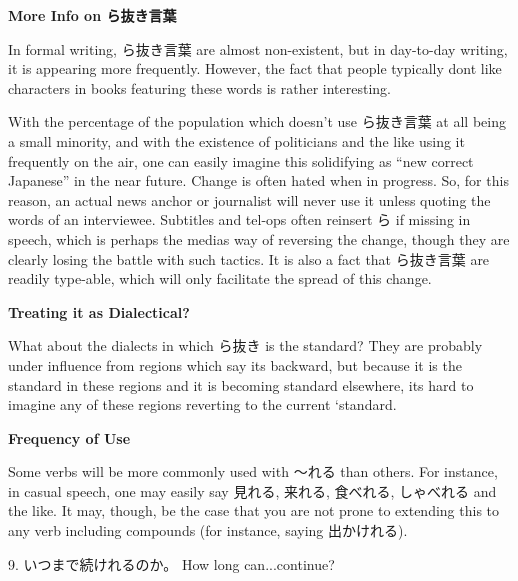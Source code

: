 \par{ \textbf{More Info on ら抜き言葉 }}

\par{ In formal writing, ら抜き言葉 are almost non-existent, but in day-to-day writing, it is appearing more frequently. However, the fact that people typically don\textquotesingle t like characters in books featuring these words is rather interesting. }

\par{ With the percentage of the population which doesn't use ら抜き言葉 at all being a small minority, and with the existence of politicians and the like using it frequently on the air, one can easily imagine this solidifying as “new correct Japanese” in the near future. Change is often hated when in progress. So, for this reason, an actual news anchor or journalist will never use it unless quoting the words of an interviewee. Subtitles and tel-ops often reinsert ら if missing in speech, which is perhaps the media\textquotesingle s way of reversing the change, though they are clearly losing the battle with such tactics. It is also a fact that ら抜き言葉 are readily type-able, which will only facilitate the spread of this change. }

\begin{center}
 \textbf{Treating it as Dialectical? }
\end{center}

\par{ What about the dialects in which ら抜き is the standard? They are probably under influence from regions which say it\textquotesingle s backward, but because it is the standard in these regions and it is becoming standard elsewhere, it\textquotesingle s hard to imagine any of these regions reverting to the current ‘standard\textquotesingle . }

\begin{center}
 \textbf{Frequency of Use }
\end{center}

\par{ Some verbs will be more commonly used with ～れる than others. For instance, in casual speech, one may easily say 見れる, 来れる, 食べれる, しゃべれる and the like. It may, though, be the case that you are not prone to extending this to any verb including compounds (for instance, saying 出かけれる). }

\par{9. いつまで続けれるのか。 \hfill\break
How long can\dothyp{}\dothyp{}\dothyp{}continue? }

